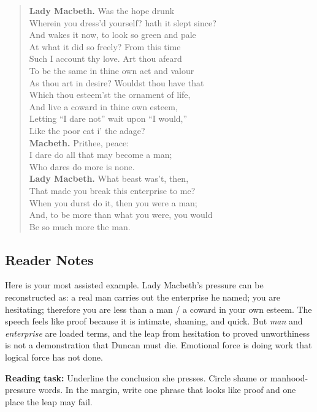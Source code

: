 \documentclass[12pt]{article}
\newenvironment{playpassage}{\begin{quote}\small\setlength{\parskip}{0.12em}\setlength{\parindent}{0pt}}{\end{quote}}
\newcommand{\speaker}[1]{\textbf{#1.}}
\begin{document}
\begin{playpassage}
\speaker{Lady Macbeth} Was the hope drunk\\
Wherein you dress'd yourself? hath it slept since?\\
And wakes it now, to look so green and pale\\
At what it did so freely? From this time\\
Such I account thy love. Art thou afeard\\
To be the same in thine own act and valour\\
As thou art in desire? Wouldst thou have that\\
Which thou esteem'st the ornament of life,\\
And live a coward in thine own esteem,\\
Letting ``I dare not'' wait upon ``I would,''\\
Like the poor cat i' the adage?\\
\speaker{Macbeth} Prithee, peace:\\
I dare do all that may become a man;\\
Who dares do more is none.\\
\speaker{Lady Macbeth} What beast was't, then,\\
That made you break this enterprise to me?\\
When you durst do it, then you were a man;\\
And, to be more than what you were, you would\\
Be so much more the man.
\end{playpassage}

\subsection*{Reader Notes}

Here is your most assisted example. Lady Macbeth's pressure can be reconstructed as: a real man carries out the enterprise he named; you are hesitating; therefore you are less than a man / a coward in your own esteem. The speech feels like proof because it is intimate, shaming, and quick. But \textit{man} and \textit{enterprise} are loaded terms, and the leap from hesitation to proved unworthiness is not a demonstration that Duncan must die. Emotional force is doing work that logical force has not done.

\textbf{Reading task:} Underline the conclusion she presses. Circle shame or manhood-pressure words. In the margin, write one phrase that looks like proof and one place the leap may fail.
\end{document}
